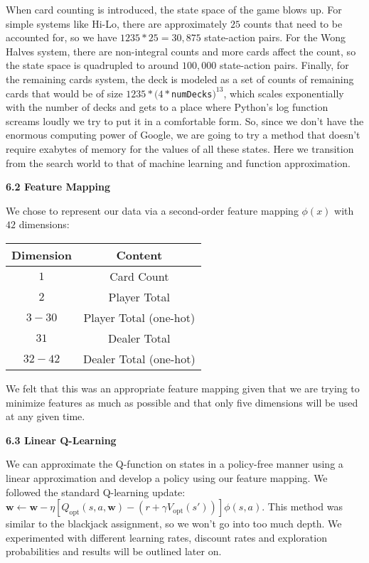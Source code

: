 \documentclass[12pt]{article}
\begin{document}
	When card counting is introduced, the state space of the game blows up. For simple systems like Hi-Lo, there are approximately $25$ counts that need to be accounted for, so we have $1235 * 25 = 30,875$ state-action pairs. For the Wong Halves system, there are non-integral counts and more cards affect the count, so the state space is quadrupled to around $100,000$ state-action pairs. Finally, for the remaining cards system, the deck is modeled as a set of counts of remaining cards that would be of size $1235 * (4 * $\texttt{numDecks}$)^{13}$, which scales exponentially with the number of decks and gets to a place where Python’s log function screams loudly we try to put it in a comfortable form. So, since we don't have the enormous computing power of Google, we are going to try a method that doesn’t require exabytes of memory for the values of all these states. Here we transition from the search world to that of machine learning and function approximation. \newline

    \textbf{6.2 Feature Mapping} \newline

	We chose to represent our data via a second-order feature mapping $\phi(x)$ with $42$ dimensions:

    \begin{center}\begin{tabular}{|c|c|}
    	\hline Dimension & Content \\
        \hline $1$ & Card Count \\
        \hline $2$ & Player Total \\
        \hline $3-30$ & Player Total (one-hot) \\
        \hline $31$ & Dealer Total \\
        \hline $32-42$ & Dealer Total (one-hot) \\
        \hline
    \end{tabular}\end{center}

    We felt that this was an appropriate feature mapping given that we are trying to minimize features as much as possible and that only five dimensions will be used at any given time. \newline

    \textbf{6.3 Linear Q-Learning} \newline

    We can approximate the Q-function on states in a policy-free manner using a linear approximation and develop a policy using our feature mapping. We followed the standard Q-learning update: $\textbf{w} \leftarrow \textbf{w} - \eta[Q_{\text{opt}}(s, a, \textbf{w}) - (r + \gamma V_{\text{opt}}(s'))]\phi(s, a)$. This method was similar to the blackjack assignment, so we won't go into too much depth. We experimented with different learning rates, discount rates and exploration probabilities and results will be outlined later on. \newline
\end{document}
